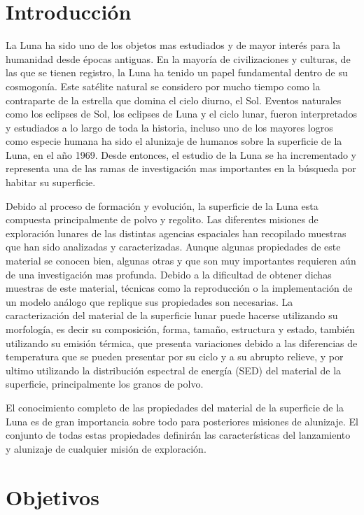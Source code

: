 \documentclass[12pt]{article}
\begin{document}
\section{Introducción}
La Luna ha sido uno de los objetos mas estudiados y de mayor interés para la humanidad desde épocas antiguas. En la mayoría de civilizaciones y culturas,
de las que se tienen registro, la Luna ha tenido un papel fundamental dentro de su cosmogonía. Este satélite natural se considero por mucho tiempo como 
la contraparte de la estrella que domina el cielo diurno, el Sol. Eventos naturales como los eclipses de Sol, los eclipses de Luna y el ciclo lunar, fueron interpretados
y estudiados a lo largo de toda la historia, incluso uno de los mayores logros como especie humana ha sido el alunizaje de humanos sobre la superficie de la Luna, 
en el año 1969. Desde entonces, el estudio de la Luna se ha incrementado y representa una de las ramas de investigación mas importantes en la búsqueda por habitar su superficie.

Debido al proceso de formación y evolución, la superficie de la Luna esta compuesta principalmente de polvo y regolito. Las diferentes misiones de exploración lunares de las distintas 
agencias espaciales han recopilado muestras que han sido analizadas y caracterizadas. Aunque algunas propiedades de este material se conocen bien, algunas otras y que son muy importantes 
requieren aún de una investigación mas profunda. Debido a la dificultad de obtener dichas muestras de este material, técnicas como la reproducción o la implementación de un modelo análogo 
que replique sus propiedades son necesarias. La caracterización del material de la superficie lunar puede hacerse utilizando su morfología, es decir su composición, 
forma, tamaño, estructura y estado, también utilizando su emisión térmica, que presenta variaciones debido a las diferencias de temperatura que se pueden presentar por su ciclo 
y a su abrupto relieve, y por ultimo utilizando la distribución espectral de energía (SED) del material de la superficie, principalmente los granos de polvo.

El conocimiento completo de las propiedades del material de la superficie de la Luna es de gran importancia sobre todo para posteriores misiones de alunizaje. 
El conjunto de todas estas propiedades definirán las características del lanzamiento y alunizaje de cualquier misión de exploración.
\section{Objetivos}
\end{document}
